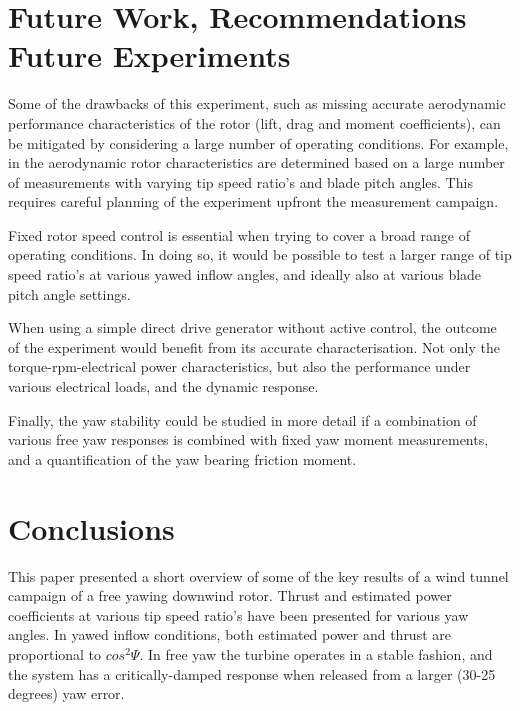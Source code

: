 \documentclass[a4paper]{jpconf}
\begin{document}

\section{Future Work, Recommendations Future Experiments}

Some of the drawbacks of this experiment, such as missing accurate aerodynamic performance characteristics of the rotor (lift, drag and moment coefficients), can be mitigated by considering a large number of operating conditions. For example, in \cite{bottasso_calibration_2014} the aerodynamic rotor characteristics are determined based on a large number of measurements with varying tip speed ratio's and blade pitch angles. This requires careful planning of the experiment upfront the measurement campaign. 

Fixed rotor speed control is essential when trying to cover a broad range of operating conditions. In doing so, it would be possible to test a larger range of tip speed ratio's at various yawed inflow angles, and ideally also at various blade pitch angle settings.

When using a simple direct drive generator without active control, the outcome of the experiment would benefit from its accurate characterisation. Not only the torque-rpm-electrical power characteristics, but also the performance under various electrical loads, and the dynamic response.

Finally, the yaw stability could be studied in more detail if a combination of various free yaw responses is combined with fixed yaw moment measurements, and a quantification of the yaw bearing friction moment.

\section{Conclusions}

This paper presented a short overview of some of the key results of a wind tunnel campaign of a free yawing downwind rotor. Thrust and estimated power coefficients at various tip speed ratio's have been presented for various yaw angles. In yawed inflow conditions, both estimated power and thrust are proportional to $cos^2 \Psi $. In free yaw the turbine operates in a stable fashion, and the system has a critically-damped response when released from a larger (30-25 degrees) yaw error.
\end{document}
